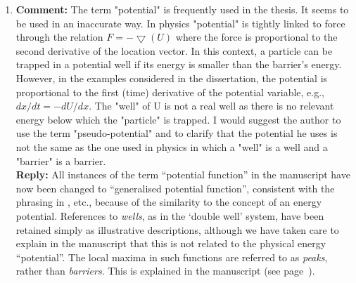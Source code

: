 \begin{enumerate}
\begin{equation*}
	\beta = \log\left[  \frac{1+\mu^2-2\mu \cos(0.2\pi)}{1+\mu^2-2\mu \cos(0.02\pi)}  \right] \,,
	\end{equation*}
	which relates the estimated PS exponent $\beta$ to the AR(1) parameter $\mu$. This equation is verified by numerical experimentation, the results of which are presented in figure~\ref{fig:1D:PSofAR1} (page~\pageref{fig:1D:PSofAR1}). The general justification for estimating the PS exponent of a power spectrum that does not exhibit true power-law scaling is then explained further in section~\ref{subsec:1D:Exponents_as_EWS:nopowerlawsacaling} (page~\pageref{subsec:1D:Exponents_as_EWS:nopowerlawsacaling}) and more discussion of the PS indicator and the AR(1) process, including the estimation of the PS exponent in oscillating time series, is presented in the following sections (see pages~\pageref{subsec:1D:Exponents_as_EWS:determining_frequency_range} to~\pageref{sec:1D:numerical_integration}). \\
	In the case of the tropical cyclone example in chapter~\ref{chap:cyclones}, we now give a more detailed discussion of the method used to remove the periodicity (see section~\ref{subsec:TC:data:oscillations}, page~\pageref{subsec:TC:data:oscillations}) and the results obtained from this experiment are now included in the manuscript. 
	\item {\bf Comment:} The term "potential" is frequently used in the thesis. It seems to be used in an inaccurate way. In physics "potential" is tightly linked to force through the relation $F=-\bigtriangledown(U)$ where the force is proportional to the second derivative of the location vector. In this context, a particle can be trapped in a potential well if its energy is smaller than the barrier's energy. However, in the examples considered in the dissertation, the potential is proportional to the first (time) derivative of the potential variable, e.g., $dx/dt=-dU/dx$. The "well" of U is not a real well as there is no relevant energy below which the "particle" is trapped. I would suggest the author to use the term "pseudo-potential" and to clarify that the potential he uses is not the same as the one used in physics in which a "well" is a well and a "barrier" is a barrier.\\
	{\bf Reply:} All instances of the term ``potential function'' in the manuscript have now been changed to ``generalised potential function'', consistent with the phrasing in \cite{nicolis2007}, etc., because of the similarity to the concept of an energy potential. References to \emph{wells}, as in the `double well' system, have been retained simply as illustrative descriptions, although we have taken care to explain in the manuscript that this is not related to the physical energy ``potential''. The local maxima in such functions are referred to as \emph{peaks}, rather than \emph{barriers}. This is explained in the manuscript (see page~\pageref{pageref:intro:generalisedpotential}).

\end{enumerate}
